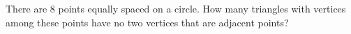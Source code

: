 There are $8$ points equally spaced on a circle. How many triangles with vertices among these points have no two vertices that are adjacent points?
